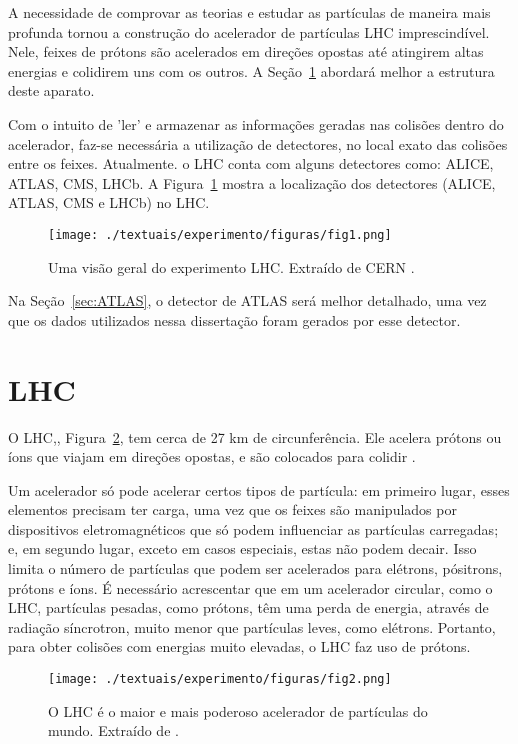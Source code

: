 A necessidade de comprovar as teorias e estudar as partículas de maneira mais profunda tornou a construção do acelerador de partículas \ac{LHC} imprescindível. Nele, feixes de prótons são acelerados em direções opostas até atingirem altas energias e colidirem uns com os outros. A Seção~\ref{sec:LHC} abordará melhor a estrutura deste aparato.

Com o intuito de 'ler' e armazenar as informações geradas nas colisões dentro do acelerador, faz-se necessária a utilização de detectores, no local exato das colisões entre os feixes. Atualmente. o LHC conta com alguns detectores como: \ac{ALICE}, \ac{ATLAS}, \ac{CMS}, \ac{LHCb}. A Figura~\ref{fig:2T04} mostra a localização dos detectores (ALICE, ATLAS, CMS e LHCb) no LHC.

\begin{figure}[!h]
  \centering
  \texttt{[image: ./textuais/experimento/figuras/fig1.png]}\\
  \caption{Uma visão geral do experimento LHC. Extraído de CERN \cite{cernwebabout}.}
  \label{fig:2T04}
\end{figure}

Na Seção~\ref{sec:ATLAS}, o detector de ATLAS será melhor detalhado, uma vez que os dados utilizados nessa dissertação foram gerados por esse detector.

\section{LHC}\label{sec:LHC}

O LHC,, Figura~\ref{fig:2T03}, tem cerca de 27 km de circunferência. Ele acelera prótons ou íons que viajam em direções opostas, e são colocados para colidir \cite{lefevre2009lhc}.

Um acelerador só pode acelerar certos tipos de partícula: em primeiro lugar, esses elementos precisam ter carga, uma vez que os feixes são manipulados por dispositivos eletromagnéticos que só podem influenciar as partículas carregadas; e, em segundo lugar, exceto em casos especiais, estas não podem decair. Isso limita o número de partículas que podem ser acelerados para elétrons, pósitrons, prótons e íons. É necessário acrescentar que em um acelerador circular, como o LHC, partículas pesadas, como prótons, têm uma perda de energia, através de radiação síncrotron, muito menor que partículas leves, como elétrons. Portanto, para obter colisões com energias muito elevadas, o LHC faz uso de prótons.

%
\begin{figure}[!h]
  \centering
  \texttt{[image: ./textuais/experimento/figuras/fig2.png]}\\
  \caption{O LHC é o maior e mais poderoso acelerador de partículas do mundo. Extraído de \cite{cernwebLHC}.}
  \label{fig:2T03}
\end{figure}
%

